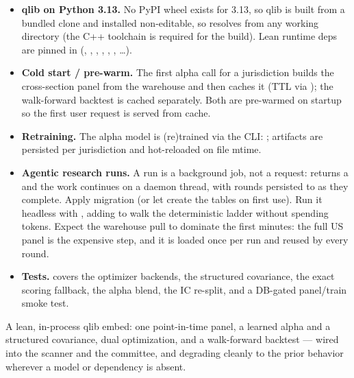 \documentclass[11pt]{article}
\begin{document}
\begin{itemize}
  \item \textbf{qlib on Python 3.13.} No PyPI wheel exists for 3.13, so qlib is
        built from a bundled clone and installed non-editable, so 
        resolves from any working directory (the C++ toolchain is required for the
        build). Lean runtime deps are pinned in 
        (, , , ,
        , , \dots).
  \item \textbf{Cold start / pre-warm.} The first alpha call for a jurisdiction
        builds the cross-section panel from the warehouse and then caches it (TTL
        via ); the walk-forward backtest is cached
        separately. Both are pre-warmed on startup so the first user request is
        served from cache.
  \item \textbf{Retraining.} The alpha model is (re)trained via the CLI:
        ; artifacts
        are persisted per jurisdiction and hot-reloaded on file mtime.
  \item \textbf{Agentic research runs.} A run is a background job, not a request:
         returns a  and the work
        continues on a daemon thread, with rounds persisted to
         as they complete. Apply
        migration  (or let
         create the tables on first use). Run it
        headless with
        ,
        adding  to walk the deterministic ladder without spending
        tokens. Expect the warehouse pull to dominate the first minutes: the full US
        panel is the expensive step, and it is loaded once per run and reused by
        every round.
  \item \textbf{Tests.}  covers the
        optimizer backends, the structured covariance, the exact scoring fallback,
        the alpha blend, the IC re-split, and a DB-gated panel/train smoke test.
\end{itemize}

\vfill
\begin{center}\small\color{muted}
A lean, in-process qlib embed: one point-in-time panel, a learned alpha and a
structured covariance, dual optimization, and a walk-forward backtest --- wired into
the scanner and the committee, and degrading cleanly to the prior behavior wherever
a model or dependency is absent.
\end{center}
\end{document}
